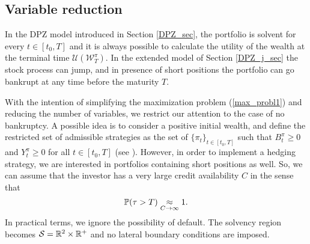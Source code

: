 \subsection{Variable reduction}\label{variable_reduction}


In the DPZ model introduced in Section \ref{DPZ_sec}, the portfolio is solvent for every
$t \in [t_0,T]$ and it is always possible to calculate the utility 
of the wealth at the terminal time $\mathcal{U}(\mathcal{W}^{\pi}_T)$.
In the extended model of Section \ref{DPZ_j_sec} the stock process can jump, and in presence of short positions the portfolio can go bankrupt at any time before the maturity $T$. 

With the intention of simplifying the maximization problem (\ref{max_probl1}) and reducing the number of variables, 
we restrict our attention to the case of no bankruptcy.
A possible idea is to consider a positive initial wealth, and define the restricted set of admissible strategies as the set of $\{\pi_t\}_{t \in [t_0,T]}$ such that 
$B^{\pi}_t \geq 0$ and $Y^{\pi}_t \geq 0$ for all $t\in [t_0,T]$ (see \cite{Benth02}).
However, in order to implement a hedging strategy, we are interested in portfolios containing short positions as well.
So, we can assume that the investor has a very large credit availability $C$ in the sense that
\begin{equation}\label{P_tau}
 \mathbb{P}(\tau > T) \underset{C\to \infty}{\approx} 1.
\end{equation}
In practical terms, we ignore the possibility of default. The solvency region becomes $\mathcal{S} = \mathbb{R}^2 \times \mathbb{R}^{+}$ and no lateral boundary conditions are imposed.

